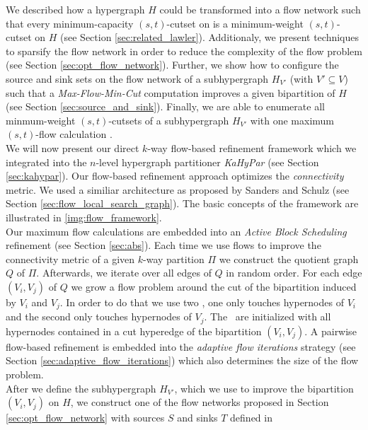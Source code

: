 We described how a hypergraph $H$ could be transformed into
a flow network  such that every minimum-capacity $(s,t)$-cutset on  is a 
minimum-weight  $(s,t)$-cutset on $H$ (see Section \ref{sec:related_lawler}). 
Additionaly, we present techniques to sparsify the
flow network  \cite{lawler1973} in order to reduce the complexity of 
the flow problem (see Section \ref{sec:opt_flow_network}). 
Further, we show how to configure the source and sink sets on the flow network of a 
subhypergraph $H_{V'}$ (with $V' \subseteq V$) such that a \emph{Max-Flow-Min-Cut} 
computation improves a given bipartition of $H$ (see Section \ref{sec:source_and_sink}). 
Finally, we are able to enumerate all minmum-weight $(s,t)$-cutsets of a subhypergraph 
$H_{V'}$ with one maximum $(s,t)$-flow calculation \cite{picard1980structure}. \\
We will now present our direct $k$-way flow-based refinement framework which we integrated
into the $n$-level hypergraph partitioner \emph{KaHyPar} \cite{heuer2017improving} 
(see Section \ref{sec:kahypar}). Our flow-based refinement approach optimizes
the \emph{connectivity} metric. We used a similiar architecture as proposed
by Sanders and Schulz \cite{sanders2011engineering} (see Section 
\ref{sec:flow_local_search_graph}). The basic concepts of the framework are
illustrated in \autoref{img:flow_framework}. \\
Our maximum flow calculations are embedded into an \emph{Active Block Scheduling}
refinement \cite{holtgrewe2010engineering} (see Section \ref{sec:abs}).
Each time we use flows to improve the connectivity metric of
a given $k$-way partition $\Pi$ we construct the quotient graph $Q$ of $\Pi$. 
Afterwards, we iterate over all edges of $Q$ in random order. For each edge
$(V_i,V_j)$ of $Q$ we grow a flow problem around the cut of the bipartition
induced by $V_i$ and $V_j$. In order to do that we use two \BFS, one only 
touches hypernodes of $V_i$ and the second only touches hypernodes of $V_j$.
The \BFS~are initialized with all hypernodes contained in a cut hyperedge
of the bipartition $(V_i,V_j)$. A pairwise flow-based refinement is embedded
into the \emph{adaptive flow iterations} strategy \cite{sanders2011engineering}
(see Section \ref{sec:adaptive_flow_iterations}) which also determines
the size of the flow problem. \\
After we define the subhypergraph $H_{V'}$, which we use to improve the bipartition
$(V_i,V_j)$ on $H$, we construct one of the flow networks proposed in Section
\ref{sec:opt_flow_network} with sources $S$ and sinks $T$ defined in
